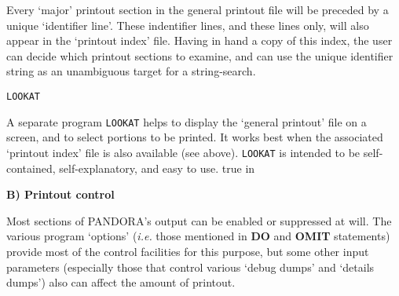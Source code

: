 Every `major' printout section in the general printout file will be
preceded by a unique `identifier line'. These indentifier lines,
and these lines only, will also appear in the `printout index' file. Having
in hand a copy of this index, the user can decide which printout sections
to examine, and can use the unique identifier string as an unambiguous
target for a string-search. 
\blankline
\centerline{\tt LOOKAT}
\blankline
A separate program {\tt LOOKAT} helps to display the `general printout'
file on a screen, and to select portions to be printed. It works best when the
associated `printout index' file is also available (see above). {\tt LOOKAT}
is intended to be self-contained, self-explanatory, and easy to use.
\ej
\top
{} true in
\centerline{\bf B) Printout control}
\blankline
Most sections of PANDORA's output can be enabled or suppressed at will.
The various program `options' ({\it i.e.} those mentioned in {\bf DO}
and {\bf OMIT} statements) provide most of the control facilities for
this purpose, but some other input parameters (especially those that
control various `debug dumps' and `details dumps') also can affect the
amount of printout.

